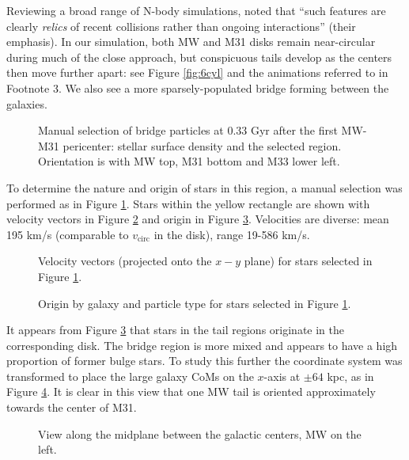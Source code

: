 \documentclass[twocolumn]{aastex63}
\begin{document}
Reviewing a broad range of N-body simulations, \citet{barnes_dynamics_1992} noted that ``such features are clearly \textit{relics} of recent collisions rather than ongoing interactions'' (their emphasis). In our simulation, both MW and M31 disks remain near-circular during much of the close approach, but conspicuous tails develop as the centers then move further apart: see Figure \ref{fig:6cyl} and the animations referred to in Footnote 3. We also see a more sparsely-populated bridge forming between the galaxies.

\begin{figure}[ht!]
	\caption{Manual selection of bridge particles at 0.33 Gyr after the first MW-M31 pericenter: stellar surface density and the selected region. Orientation is with MW top, M31 bottom and M33 lower left. 
	\label{fig:bridge_a}}
\end{figure}

To determine the nature and origin of stars in this region, a manual selection was performed as in Figure \ref{fig:bridge_a}. Stars within the yellow rectangle are shown with velocity vectors in Figure \ref{fig:bridge_b} and origin in Figure \ref{fig:bridge_c}. Velocities are diverse: mean 195 km/s (comparable to $v_{\text{circ}}$ in the disk), range 19-586 km/s. 

\begin{figure}[ht!]
	\caption{Velocity vectors (projected onto the $x-y$ plane) for stars selected in Figure \ref{fig:bridge_a}. 
		\label{fig:bridge_b}}
\end{figure}

\begin{figure}[ht!]
	\caption{Origin by galaxy and particle type for stars selected in Figure \ref{fig:bridge_a}.
		\label{fig:bridge_c}}
\end{figure}

It appears from Figure \ref{fig:bridge_c} that stars in the tail regions originate in the corresponding disk. The bridge region is more mixed and appears to have a high proportion of former bulge stars. To study this further the coordinate system was transformed to place the large galaxy CoMs on the $x$-axis at $\pm 64$ kpc, as in Figure \ref{fig:bridge2}. It is clear in this view that one MW tail is oriented approximately towards the center of M31. 

\begin{figure}[htb!]
	\caption{View along the midplane between the galactic centers, MW on the left.
		\label{fig:bridge2}}
\end{figure}
\end{document}
